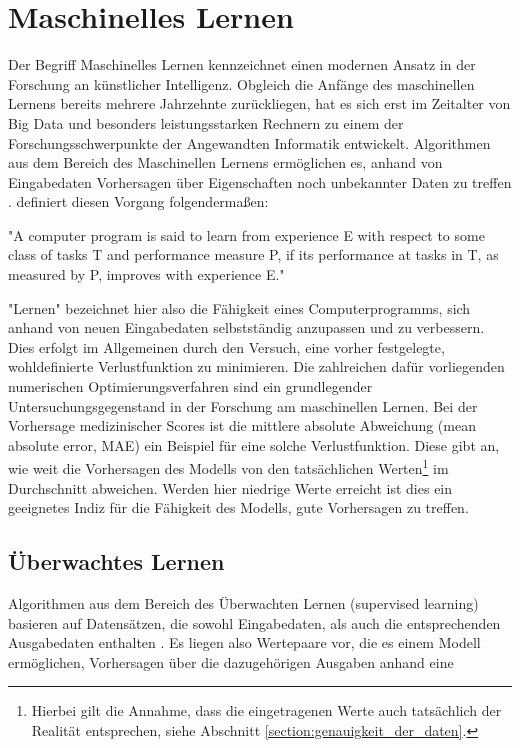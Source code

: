 \section{Maschinelles Lernen}
Der Begriff Maschinelles Lernen kennzeichnet einen modernen Ansatz in der Forschung an künstlicher Intelligenz. Obgleich die Anfänge des maschinellen Lernens bereits mehrere Jahrzehnte zurückliegen, hat es sich erst im Zeitalter von Big Data und besonders leistungsstarken Rechnern zu einem der Forschungsschwerpunkte der Angewandten Informatik entwickelt. Algorithmen aus dem Bereich des Maschinellen Lernens ermöglichen es, anhand von Eingabedaten Vorhersagen über Eigenschaften noch unbekannter Daten zu treffen \citep{mitchellMachineLearning1997}. \cite{mitchellMachineLearning1997} definiert diesen Vorgang folgendermaßen:

\begin{itquote}
    {\foreignlanguage{english}{"A computer program is said to learn from experience E with respect to some class of tasks T and performance measure P, if its performance at tasks in T, as measured by P, improves with experience E."}}
\end{itquote}

"Lernen" bezeichnet hier also die Fähigkeit eines Computerprogramms, sich anhand von neuen Eingabedaten selbstständig anzupassen und zu verbessern. Dies erfolgt im Allgemeinen durch den Versuch, eine vorher festgelegte, wohldefinierte Verlustfunktion zu minimieren. Die zahlreichen dafür vorliegenden numerischen Optimierungsverfahren sind ein grundlegender Untersuchungsgegenstand in der Forschung am maschinellen Lernen. Bei der Vorhersage medizinischer Scores ist die mittlere absolute Abweichung (mean absolute error, MAE) ein Beispiel für eine solche Verlustfunktion. Diese gibt an, wie weit die Vorhersagen des Modells von den tatsächlichen Werten\footnote{Hierbei gilt die Annahme, dass die eingetragenen Werte auch tatsächlich der Realität entsprechen, siehe Abschnitt \ref{section:genauigkeit_der_daten}.} im Durchschnitt abweichen. Werden hier niedrige Werte erreicht ist dies ein geeignetes Indiz für die Fähigkeit des Modells, gute Vorhersagen zu treffen.

\subsection{Überwachtes Lernen}\label{section:supervised_learning}
Algorithmen aus dem Bereich des Überwachten Lernen (supervised learning) basieren auf Datensätzen, die sowohl Eingabedaten, als auch die entsprechenden Ausgabedaten enthalten \citep{russellArtificialIntelligenceModern2020}. Es liegen also Wertepaare vor, die es einem Modell ermöglichen, Vorhersagen über die dazugehörigen Ausgaben anhand eine

